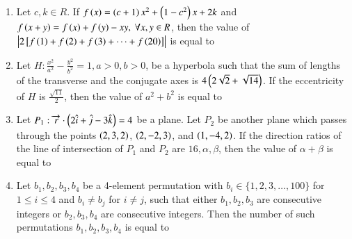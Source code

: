 \documentclass[journal,9pt,onecolumn]{IEEEtran}
\begin{document}
\begin{enumerate}
\item Let $c, k \in R$. If $f\left(x\right) = \left(c+1\right)x^2 + \left(1 - c^2\right)x + 2k$ and $f\left(x+y\right) = f\left(x\right) + f\left(y\right) - xy, \ \forall x, y \in R$, then the value of $\left\vert 2 {}\left[ f\left(1\right) + f\left(2\right) + f\left(3\right) + \dots + f\left(20\right) \right] \right\vert$ is equal to

\item Let $H: \frac{x^2}{a^2} - \frac{y^2}{b^2} = 1, a > 0, b > 0$, be a hyperbola such that the sum of lengths of the transverse and the conjugate axes is $4\left(2\sqrt{2} + \sqrt{14}\right)$. If the eccentricity of $H$ is $\frac{\sqrt{11}}{2}$, then the value of $a^2 + b^2$ is equal to

\item Let $P_1: \overrightarrow{r} \cdot \left(2\hat{i} + \hat{j} - 3\hat{k}\right) = 4$ be a plane. Let $P_2$ be another plane which passes through the points $\left(2, 3, 2\right)$, $\left(2, -2, 3\right)$, and $\left(1, -4, 2\right)$. If the direction ratios of the line of intersection of $P_1$ and $P_2$ are $16, \alpha, \beta$, then the value of $\alpha + \beta$ is equal to

\item Let $b_1, b_2, b_3, b_4$ be a 4-element permutation with $b_i \in \{1, 2, 3, \ldots, 100\}$ for $1 \leq i \leq 4$ and $b_i \neq b_j$ for $i \neq j$, such that either $b_1, b_2, b_3$ are consecutive integers or $b_2, b_3, b_4$ are consecutive integers. Then the number of such permutations $b_1, b_2, b_3, b_4$ is equal to

\end{enumerate}
\end{document}

